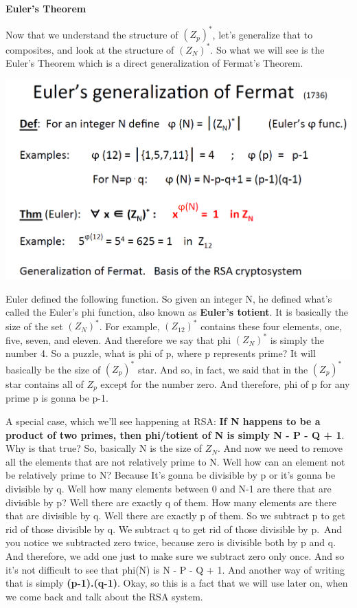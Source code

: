 \documentclass[11pt]{article}
\makeatletter
\def\maxwidth{\ifdim\Gin@nat@width>\linewidth\linewidth
    \else\Gin@nat@width\fi}
\let\Oldincludegraphics\includegraphics
\renewcommand{\includegraphics}[1]{\Oldincludegraphics[width=.8\maxwidth]{#1}}
\makeatother
\begin{document}
\textbf{Euler's Theorem}

Now that we understand the structure of \((Z_{p})^{*}\), let's
generalize that to composites, and look at the structure of
\((Z_{N})^{*}\). So what we will see is the Euler's Theorem which is a
direct generalization of Fermat's Theorem.

\includegraphics{./Images/EulersGenFermat.png}

Euler defined the following function. So given an integer N, he defined
what's called the Euler's phi function, also known as \textbf{Euler's
totient}. It is basically the size of the set \((Z_{N})^{*}\). For
example, \((Z_{12})^{*}\) contains these four elements, one, five,
seven, and eleven. And therefore we say that phi \((Z_{N})^{*}\) is
simply the number 4. So a puzzle, what is phi of p, where p represents
prime? It will basically be the size of \((Z_{p})^{*}\) star. And so, in
fact, we said that in the \((Z_{p})^{*}\) star contains all of \(Z_{p}\)
except for the number zero. And therefore, phi of p for any prime p is
gonna be p-1.

A special case, which we'll see happening at RSA: \textbf{If N happens
to be a product of two primes, then phi/totient of N is simply N - P - Q
+ 1}. Why is that true? So, basically N is the size of \(Z_{N}\). And
now we need to remove all the elements that are not relatively prime to
N. Well how can an element not be relatively prime to N? Because It's
gonna be divisible by p or it's gonna be divisible by q. Well how many
elements between 0 and N-1 are there that are divisible by p? Well there
are exactly q of them. How many elements are there that are divisible by
q. Well there are exactly p of them. So we subtract p to get rid of
those divisible by q. We subtract q to get rid of those divisible by
p.~And you notice we subtracted zero twice, because zero is divisible
both by p and q. And therefore, we add one just to make sure we subtract
zero only once. And so it's not difficult to see that phi(N) is N - P -
Q + 1. And another way of writing that is simply \textbf{(p-1).(q-1)}.
Okay, so this is a fact that we will use later on, when we come back and
talk about the RSA system.
\end{document}
